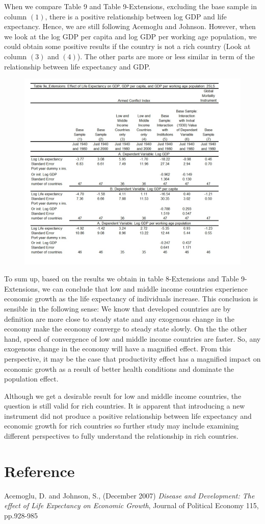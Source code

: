\documentclass[11pt]{article}
\begin{document}
When we compare Table 9 and Table 9-Extensions, excluding the base sample in column $(1)$, there is a positive relationship between log GDP and life expectancy. Hence, we are still following Acemoglu and Johnson. However, when we look at the log GDP per capita and log GDP per working age population, we could obtain some positive results if the country is not a rich country (Look at column $(3)$ and $(4)$). The other parts are more or less similar in term of the relationship between life expectancy and GDP.
\begin{figure} [H]
\centering
\includegraphics[width=\textwidth]{table9ex}
\label{table9ex}
\end{figure}
To sum up, based on the results we obtain in table 8-Extensions and Table 9-Extensions, we can conclude that low and middle income countries experience economic growth as the life expectancy of individuals increase. This conclusion is sensible in the following sense: We know that developed countries are by definition are more close to steady state and any exogenous change in the economy make the economy converge to steady state slowly. On the the other hand, speed of convergence of low and middle income countries are faster. So, any exogenous change in the economy will have a magnified effect. From this perspective, it may be the case that productivity effect has a magnified impact on economic growth as a result of better health conditions and dominate the population effect. 

Although we get a desirable result for low and middle income countries, the question is still valid for rich countries. It is apparent that introducing a new instrument did not produce a positive relationship between life expectancy and economic growth for rich countries so further study may include examining different perspectives to fully understand the relationship in rich countries.

\section*{Reference}
Acemoglu, D. and Johnson, S., (December 2007) \emph{Disease and Development: The effect of Life Expectancy on Economic Growth}, Journal of Political Economy 115, pp.928-985
\end{document}

